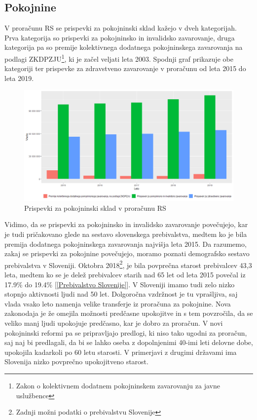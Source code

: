 \documentclass[12pt, a4paper]{article}
\begin{document}
\subsection[Pokojnine]{Pokojnine}
\hspace*{5mm} V proračunu RS se prispevki za pokojninski sklad kažejo v dveh kategorijah. Prva kategorija so prispevki za pokojninsko in invalidsko zavarovanje, druga kategorija pa so premije kolektivnega dodatnega pokojninskega zavarovanja na podlagi ZKDPZJU\footnote{Zakon o kolektivnem dodatnem pokojninskem zavarovanju za javne uslužbence}, ki je začel veljati leta 2003. Spodnji graf prikazuje obe kategoriji ter prispevke za zdravstveno zavarovanje v proračunu od leta 2015 do leta 2019.
\begin{figure}[h]
\centering
\includegraphics[width = 14 cm]{prispevki_delodajalcev_za_socialno_varnost_graf.png}
\caption{Prispevki za pokojninski sklad v proračunu RS}
\label{Slika 3}
\end{figure}

\hspace*{5mm} Vidimo, da se prispevki za pokojninsko in invalidsko zavarovanje povečujejo, kar je tudi pričakovano glede na sestavo slovenskega prebivalstva, medtem ko je bila premija dodatnega pokojninskega zavarovanja najvišja leta 2015. Da razumemo, zakaj se prispevki za pokojnine povečujejo, moramo poznati demografsko sestavo prebivalstva v Sloveniji. Oktobra 2018\footnote{Zadnji možni podatki o prebivalstvu Slovenije}, je bila povprečna starost prebivalcev 43,3 leta, medtem ko se je delež prebivalcev starih nad 65 let od leta 2015 povečal iz 17.9\% do 19.4\% [\ref{Prebivalstvo Slovenije}]. V Sloveniji imamo tudi zelo nizko stopnjo aktivnosti ljudi nad 50 let. Dolgoročna vzdržnost je tu vprašljiva, saj vlada vsako leto namenja velike transferje iz proračuna za pokojnine. Nova zakonodaja je že omejila možnosti predčasne upokojitve in s tem povzročila, da se veliko manj ljudi upokojuje predčasno, kar je dobro za proračun. V novi pokojninski reformi pa se pripravljajo predlogi, ki niso tako ugodni za proračun, saj naj bi predlagali, da bi se lahko oseba z dopolnjenimi 40-imi leti delovne dobe, upokojila kadarkoli po 60 letu starosti. V primerjavi z drugimi državami ima Slovenija nizko povprečno upokojitveno starost.
\end{document}
